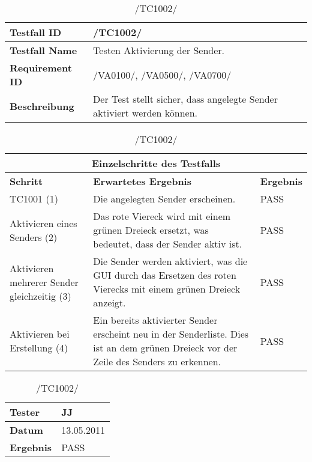 \begin{table}[h]
\caption{/TC1002/}
\label{tab:TC1002}
\begin{center}
\begin{tabular}{|p{3.5cm}|p{11cm}|}
\hline
\textbf{Testfall ID} & /TC1002/\\
\hline
\textbf{Testfall Name} & Testen Aktivierung der Sender.
\\
\hline
\textbf{Requirement ID} & /VA0100/, /VA0500/, /VA0700/\\
\hline
\textbf{Beschreibung} & Der Test stellt sicher, dass angelegte Sender aktiviert
werden können.
\\
\hline
\end{tabular}
\begin{tabular}{|p{4cm}|p{7.8cm}|p{2.3cm}|}
\multicolumn{3}{|c|}{\textbf{Einzelschritte des Testfalls}} \\
\hline
\textbf{Schritt} & \textbf{Erwartetes Ergebnis} & \textbf{Ergebnis}\\
\hline
TC1001 (1) & Die angelegten Sender
 erscheinen. & PASS
\\
\hline
Aktivieren eines Senders (2) & Das rote Viereck wird mit einem grünen Dreieck
 ersetzt, was bedeutet, dass der Sender aktiv ist. & PASS
\\
\hline
Aktivieren mehrerer Sender gleichzeitig (3) & Die Sender werden aktiviert,
was die GUI durch das Ersetzen des roten Vierecks mit einem grünen Dreieck
anzeigt. & PASS
\\
\hline
Aktivieren bei Erstellung (4) & Ein bereits
 aktivierter Sender erscheint neu in der Senderliste. Dies ist an dem grünen
 Dreieck vor der Zeile des Senders zu erkennen. & PASS\\
\hline
\end{tabular}
\begin{tabular}{|p{3.5cm}|p{11cm}|}
\textbf{Tester} & JJ\\
\hline
\textbf{Datum} & 13.05.2011\\
\hline
\textbf{Ergebnis} & PASS\\
\hline
\end{tabular}
\end{center}
\end{table}

